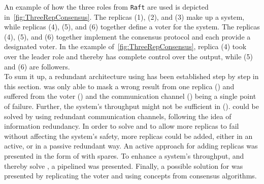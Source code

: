 An example of how the three roles from \texttt{Raft} are used is depicted in~\autoref{fig:ThreeRepConsensus}.
The replicas (1), (2), and (3) make up a  system, while replicas (4), (5), and (6) together define a voter for the system.
The replicas (4), (5), and (6) together implement the consensus protocol and each provide a designated voter.
In the example of~\autoref{fig:ThreeRepConsensus}, replica (4) took over the leader role and thereby has complete control over the output, while (5) and (6) are followers.
\\

To sum it up, a redundant architecture using  has been established step by step in this section.
 was only able to mask a wrong result from one replica (\ChallengeWR) and suffered from the voter (\ChallengeVoter) and the communication channel (\ChallengeComm) being a single point of failure.
Further, the system's throughput might not be sufficient in  (\ChallengeThrough).
\ChallengeComm could be solved by using redundant communication channels, following the idea of information redundancy.
In order to solve \ChallengeWR and to allow more replicas to fail without affecting the system's safety, more replicas could be added, either in an active, or in a passive redundant way.
An active approach for adding replicas was presented in the form of  with spares.
To enhance a system's throughput, and thereby solve \ChallengeThrough, a pipelined  was presented.
Finally, a possible solution for \ChallengeVoter was presented by replicating the voter and using concepts from consensus algorithms.
